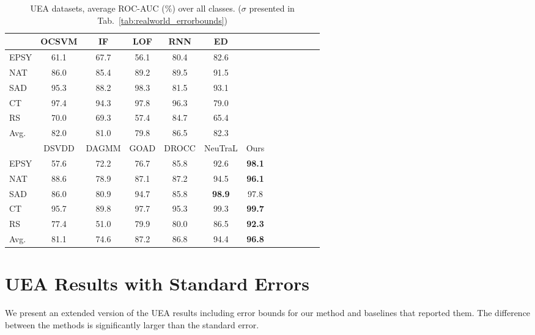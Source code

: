 \documentclass{article}
\begin{document}
\begin{table*}
\caption{UEA datasets, average ROC-AUC ($\%$) over all classes. ($\sigma$ presented in Tab.~\ref{tab:realworld_errorbounds})}
\centering
\small
\begin{tabular}{lcccccccccccc}
\toprule


&	OCSVM	&	IF	&	LOF	&	RNN	&	ED	\\
\midrule

EPSY	& 61.1	&	67.7	&	56.1	&	80.4	&	82.6 \\
NAT	& 86.0	&	85.4	&	89.2	&	89.5	&	91.5 \\
SAD	&  95.3	&	88.2	&	98.3	&	81.5	&	93.1 \\
CT	& 97.4	&	94.3	&	97.8	&	96.3	&	79.0 \\
RS	&  70.0	&	69.3	&	57.4	&	84.7	&	65.4 \\
\midrule
Avg.	&  82.0	&	81.0	&	79.8	&	86.5	&	82.3	\\
\midrule
	&	DSVDD	& DAGMM		&	GOAD	&	DROCC	&	NeuTraL	&	Ours	\\ \midrule
EPSY	&	57.6	& 72.2  &	76.7	&	85.8	&	92.6	&	\textbf{98.1}	\\
NAT		&	88.6 & 78.9	& 	87.1	&	87.2	&	94.5	&	\textbf{96.1}	\\
SAD		&	86.0 & 80.9	& 	94.7	&	85.8	&	\textbf{98.9}	&	97.8	\\
CT		&	95.7 & 89.8	& 	97.7	&	95.3	&	99.3	&	\textbf{99.7}	\\
RS		&	77.4 & 51.0	& 	79.9	&	80.0	&	86.5	& \textbf{92.3}		\\ \midrule
Avg.	&		81.1 & 74.6 	&	87.2	&	86.8	&	94.4	&	\textbf{96.8}	\\




\bottomrule
\end{tabular}
\label{tab:realworld_supp}
\end{table*}



\section{UEA Results with Standard Errors}
\label{app:extended_uea_bounds}

We present an extended version of the UEA results including error bounds for our method and baselines that reported them. The difference between the methods is significantly larger than the standard error.
\end{document}
